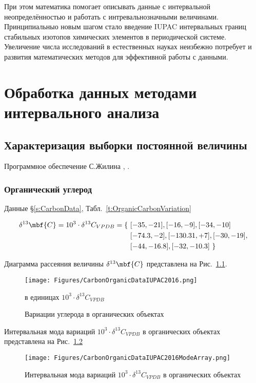 \documentclass[a5paper,openany]{book}
\begin{document}
При этом математика помогает описывать данные с интервальной неопределённостью  и работать с интревальнозначными величинами. Принципиальныо новым шагом стало введение IUPAC интервальных границ стабильных изотопов химических элементов в периодической системе.  Увеличение числа исследований в естественных науках неизбежно потребует и развития математических методов для  эффективной работы с данными. 

\chapter{Обработка данных методами интервального анализа}\label{s:DataAnalysis}

\section{Характеризация выборки постоянной величины}

Программное обеспечение С.Жилина \cite{InteSoft}, \cite{InteKaucherSoft}.

\subsection{Органический углерод}

Данные \S\ref{s:CarbonData}, Табл.~\ref{t:OrganicCarbonVariation}

\begin{align}
\delta ^{13}\mbf{C} =	10^3 \cdot \delta ^{13}C_{VPDB} = \{ \
&	[-35, -21 ], [ -16, -9 ], [ -34, -10 ] \nonumber \\
&	[ -74.3, -2 ], [ -130.31, +7 ], [ -30, -19], \nonumber \\
& 	[ -44, -16.8], [ -32, -10.3] \	\}
\end{align}

Диаграмма рассеяния величины $\delta ^{13}\mbf{C}$ представлена на Рис.~\ref{f:OrganicCarbonVariation}.
\begin{figure}[ht] 
	\centering\small
	\unitlength=1mm
	{\texttt{[image: Figures/CarbonOrganicDataIUPAC2016.png]}} 
	\caption{Вариации углерода в органических объектах} в единицах $10^3 \cdot \delta ^{13}C_{VPDB}$
\label{f:OrganicCarbonVariation}
\end{figure}

Интервальная мода   
вариаций $10^3 \cdot \delta ^{13}C_{VPDB}$ в органических объектах представлена на Рис.~\ref{f:OrganicCarbonVariationMode}
\begin{figure}[ht] 
\begin{center}
	\unitlength=1mm
	{\texttt{[image: Figures/CarbonOrganicDataIUPAC2016ModeArray.png]}} 
	\caption{Интервальная мода 
		вариаций $10^3 \cdot \delta ^{13}C_{VPDB}$ в органических объектах} 
	\label{f:OrganicCarbonVariationMode}
\end{center}	
\end{figure}
\end{document}
